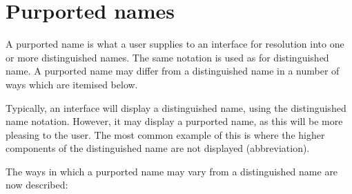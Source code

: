 \section {Purported names}


A purported name is what a user supplies to an interface for resolution
into  one or more distinguished names.
The same
notation is used as for distinguished name.  
A purported name may differ from a distinguished name in a number of ways
which are itemised below.

Typically, an
interface will display a distinguished name, using the distinguished name
notation.  However, it may display a purported name, as this will be more
pleasing to the user.  The most common example of this is where the higher
components of the distinguished name are not displayed (abbreviation).

The ways in which a purported name may vary from a distinguished name are
now described:


